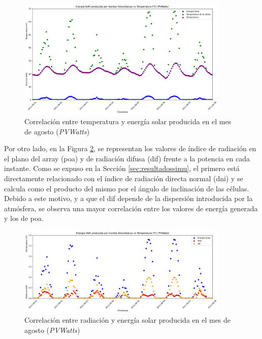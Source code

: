 \vspace{3mm}

\begin{figure}[H]
  \centering
  \includegraphics[width=0.9\textwidth]{img/diseno/energiavstempcel.png}
  \caption{Correlación entre temperatura y energía solar producida en el mes de agosto (\textit{PVWatts})}
  \label{fig:energiavstempcel}
\end{figure}

Por otro lado, en la Figura \ref{fig:energiavsrad}, se representan los valores de índice de radiación en el plano del array (\gls{poa}) y de radiación difusa (\gls{dif}) frente a la potencia en cada instante. Como se expuso en la Sección \ref{sec:resultadossimu}, el primero está directamente relacionado con el índice de radiación directa normal (\gls{dni}) y se calcula como el producto del mismo por el ángulo de inclinación de las células. Debido a este motivo, y a que el \gls{dif} depende de la dispersión introducida por la atmósfera, se observa una mayor correlación entre los valores de energía generada y los de \gls{poa}.

\vspace{3mm}

\begin{figure}[H]
  \centering
  \includegraphics[width=0.9\textwidth]{img/diseno/energiavsrad.png}
  \caption{Correlación entre radiación y energía solar producida en el mes de agosto (\textit{PVWatts})}
  \label{fig:energiavsrad}
\end{figure}


